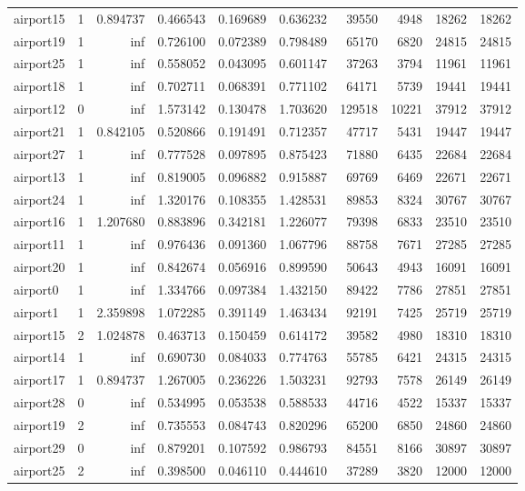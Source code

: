 \begin{longtable}{|l|r|r|r|r|r|r|r|r|r|}
airport15 & 1 & 0.894737 & 0.466543 & 0.169689 & 0.636232 & 39550 & 4948 & 18262 & 18262 \\
airport19 & 1 & inf & 0.726100 & 0.072389 & 0.798489 & 65170 & 6820 & 24815 & 24815 \\
airport25 & 1 & inf & 0.558052 & 0.043095 & 0.601147 & 37263 & 3794 & 11961 & 11961 \\
airport18 & 1 & inf & 0.702711 & 0.068391 & 0.771102 & 64171 & 5739 & 19441 & 19441 \\
airport12 & 0 & inf & 1.573142 & 0.130478 & 1.703620 & 129518 & 10221 & 37912 & 37912 \\
airport21 & 1 & 0.842105 & 0.520866 & 0.191491 & 0.712357 & 47717 & 5431 & 19447 & 19447 \\
airport27 & 1 & inf & 0.777528 & 0.097895 & 0.875423 & 71880 & 6435 & 22684 & 22684 \\
airport13 & 1 & inf & 0.819005 & 0.096882 & 0.915887 & 69769 & 6469 & 22671 & 22671 \\
airport24 & 1 & inf & 1.320176 & 0.108355 & 1.428531 & 89853 & 8324 & 30767 & 30767 \\
airport16 & 1 & 1.207680 & 0.883896 & 0.342181 & 1.226077 & 79398 & 6833 & 23510 & 23510 \\
airport11 & 1 & inf & 0.976436 & 0.091360 & 1.067796 & 88758 & 7671 & 27285 & 27285 \\
airport20 & 1 & inf & 0.842674 & 0.056916 & 0.899590 & 50643 & 4943 & 16091 & 16091 \\
airport0 & 1 & inf & 1.334766 & 0.097384 & 1.432150 & 89422 & 7786 & 27851 & 27851 \\
airport1 & 1 & 2.359898 & 1.072285 & 0.391149 & 1.463434 & 92191 & 7425 & 25719 & 25719 \\
airport15 & 2 & 1.024878 & 0.463713 & 0.150459 & 0.614172 & 39582 & 4980 & 18310 & 18310 \\
airport14 & 1 & inf & 0.690730 & 0.084033 & 0.774763 & 55785 & 6421 & 24315 & 24315 \\
airport17 & 1 & 0.894737 & 1.267005 & 0.236226 & 1.503231 & 92793 & 7578 & 26149 & 26149 \\
airport28 & 0 & inf & 0.534995 & 0.053538 & 0.588533 & 44716 & 4522 & 15337 & 15337 \\
airport19 & 2 & inf & 0.735553 & 0.084743 & 0.820296 & 65200 & 6850 & 24860 & 24860 \\
airport29 & 0 & inf & 0.879201 & 0.107592 & 0.986793 & 84551 & 8166 & 30897 & 30897 \\
airport25 & 2 & inf & 0.398500 & 0.046110 & 0.444610 & 37289 & 3820 & 12000 & 12000 \\

\end{longtable}
